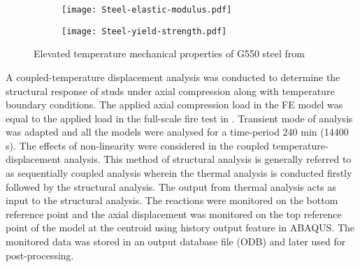 \begin{figure}[!htbp]
	\centering
	\begin{subfigure}[b]{0.7\textwidth}
		\centering
		\texttt{[image: Steel-elastic-modulus.pdf]}
		\caption{}
		\label{subfig:Steel-elastic-modulus}
	\end{subfigure}
	\begin{subfigure}[b]{0.7\textwidth}
		\centering
		\texttt{[image: Steel-yield-strength.pdf]}
		\caption{}
		\label{subfig:Steel-yield strength}
	\end{subfigure}
	   \caption{Elevated temperature mechanical properties of G550 steel from \citet{Kankanamge2011}}
	   \label{fig:steel-elevated-mechanical}
\end{figure} 

A coupled-temperature displacement analysis was conducted to determine the structural response of studs under axial compression along with temperature boundary conditions. The applied axial compression load in the FE model was equal to the applied load in the full-scale fire test in . Transient mode of analysis was adapted and all the models were analysed for a time-period 240 min (14400 s). The effects of non-linearity were considered in the coupled temperature-displacement analysis. This method of structural analysis is generally referred to as sequentially coupled analysis wherein the thermal analysis is conducted firstly followed by the structural analysis. The output from thermal analysis acts as input to the structural analysis. The reactions were monitored on the bottom reference point and the axial displacement was monitored on the top reference point of the model at the centroid using history output feature in ABAQUS. The monitored data was stored in an output database file (ODB) and later used for post-processing. 

